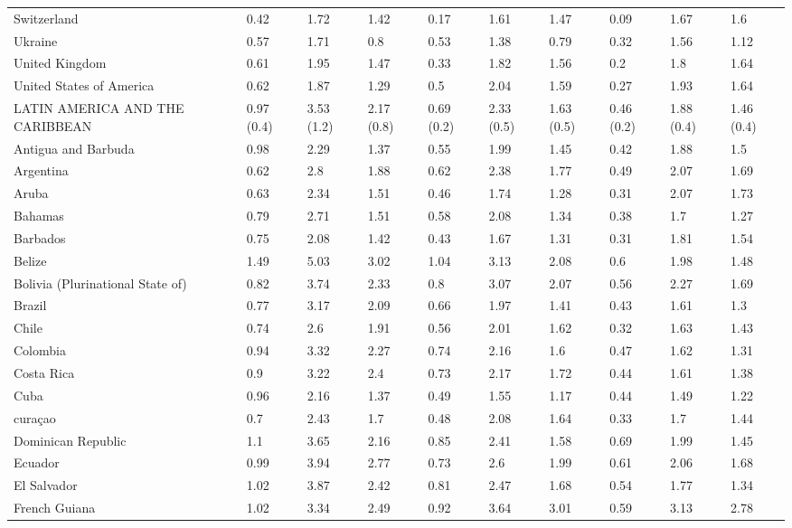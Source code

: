 \begin{longtable}[t]{llllllllll}
Switzerland & 0.42 & 1.72 & 1.42 & 0.17 & 1.61 & 1.47 & 0.09 & 1.67 & 1.6\\
Ukraine & 0.57 & 1.71 & 0.8 & 0.53 & 1.38 & 0.79 & 0.32 & 1.56 & 1.12\\
United Kingdom & 0.61 & 1.95 & 1.47 & 0.33 & 1.82 & 1.56 & 0.2 & 1.8 & 1.64\\
United States of America & 0.62 & 1.87 & 1.29 & 0.5 & 2.04 & 1.59 & 0.27 & 1.93 & 1.64\\
LATIN AMERICA AND THE CARIBBEAN & 0.97 (0.4) & 3.53 (1.2) & 2.17 (0.8) & 0.69 (0.2) & 2.33 (0.5) & 1.63 (0.5) & 0.46 (0.2) & 1.88 (0.4) & 1.46 (0.4)\\
Antigua and Barbuda & 0.98 & 2.29 & 1.37 & 0.55 & 1.99 & 1.45 & 0.42 & 1.88 & 1.5\\
Argentina & 0.62 & 2.8 & 1.88 & 0.62 & 2.38 & 1.77 & 0.49 & 2.07 & 1.69\\
Aruba & 0.63 & 2.34 & 1.51 & 0.46 & 1.74 & 1.28 & 0.31 & 2.07 & 1.73\\
Bahamas & 0.79 & 2.71 & 1.51 & 0.58 & 2.08 & 1.34 & 0.38 & 1.7 & 1.27\\
Barbados & 0.75 & 2.08 & 1.42 & 0.43 & 1.67 & 1.31 & 0.31 & 1.81 & 1.54\\
Belize & 1.49 & 5.03 & 3.02 & 1.04 & 3.13 & 2.08 & 0.6 & 1.98 & 1.48\\
Bolivia (Plurinational State of) & 0.82 & 3.74 & 2.33 & 0.8 & 3.07 & 2.07 & 0.56 & 2.27 & 1.69\\
Brazil & 0.77 & 3.17 & 2.09 & 0.66 & 1.97 & 1.41 & 0.43 & 1.61 & 1.3\\
Chile & 0.74 & 2.6 & 1.91 & 0.56 & 2.01 & 1.62 & 0.32 & 1.63 & 1.43\\
Colombia & 0.94 & 3.32 & 2.27 & 0.74 & 2.16 & 1.6 & 0.47 & 1.62 & 1.31\\
Costa Rica & 0.9 & 3.22 & 2.4 & 0.73 & 2.17 & 1.72 & 0.44 & 1.61 & 1.38\\
Cuba & 0.96 & 2.16 & 1.37 & 0.49 & 1.55 & 1.17 & 0.44 & 1.49 & 1.22\\
curaçao & 0.7 & 2.43 & 1.7 & 0.48 & 2.08 & 1.64 & 0.33 & 1.7 & 1.44\\
Dominican Republic & 1.1 & 3.65 & 2.16 & 0.85 & 2.41 & 1.58 & 0.69 & 1.99 & 1.45\\
Ecuador & 0.99 & 3.94 & 2.77 & 0.73 & 2.6 & 1.99 & 0.61 & 2.06 & 1.68\\
El Salvador & 1.02 & 3.87 & 2.42 & 0.81 & 2.47 & 1.68 & 0.54 & 1.77 & 1.34\\
French Guiana & 1.02 & 3.34 & 2.49 & 0.92 & 3.64 & 3.01 & 0.59 & 3.13 & 2.78\\

\end{longtable}
